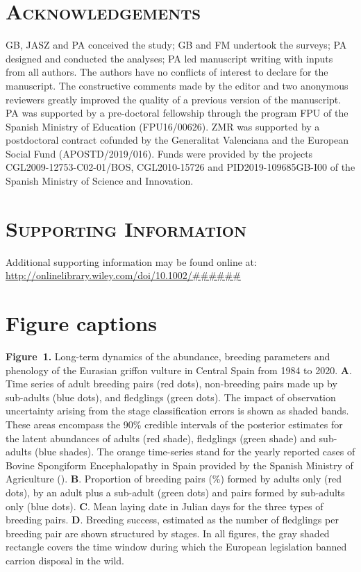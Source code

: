 \documentclass[12pt]{article}
\begin{document}
\section*{\textsc{Acknowledgements}}
GB, JASZ and PA conceived the study; GB and FM undertook the surveys; PA designed and conducted the analyses; PA led manuscript writing with inputs from all authors. The authors have no conflicts of interest to declare for the manuscript. The constructive comments made by the editor and two anonymous reviewers greatly improved the quality of a previous version of the manuscript. PA was supported by a pre-doctoral fellowship through the program FPU of the Spanish Ministry of Education (FPU16/00626). ZMR was supported by a postdoctoral contract cofunded by the Generalitat Valenciana and the European Social Fund (APOSTD/2019/016). Funds were provided by the projects CGL2009-12753-C02-01/BOS, CGL2010-15726 and PID2019-109685GB-I00 of the Spanish Ministry of Science and Innovation.

%
\printbibliography

\section*{\textsc{Supporting Information}}
Additional supporting information may be found online at:  \url{http://onlinelibrary.wiley.com/doi/10.1002/######}

\newpage

\section*{Figure captions}
\noindent \textbf{Figure~1.} Long-term dynamics of the abundance, breeding parameters and phenology of the Eurasian griffon vulture in Central Spain from 1984 to 2020. \textbf{A}. Time series of adult breeding pairs (red dots), non-breeding pairs made up by sub-adults (blue dots), and fledglings (green dots). The impact of observation uncertainty arising from the stage classification errors is shown as shaded bands. These areas encompass the 90\% credible intervals of the posterior estimates for the latent abundances of adults (red shade), fledglings (green shade) and sub-adults (blue shades). The orange time-series stand for the yearly reported cases of Bovine Spongiform Encephalopathy in Spain provided by the Spanish Ministry of Agriculture (\cite{MAPAMA2018}). \textbf{B}. Proportion of breeding pairs (\%) formed by adults only (red dots), by an adult plus a sub-adult (green dots) and pairs formed by sub-adults only (blue dots). \textbf{C}. Mean laying date in Julian days for the three types of breeding pairs. \textbf{D}. Breeding success, estimated as the number of fledglings per breeding pair are shown structured by stages. In all figures, the gray shaded rectangle covers the time window during which the European legislation banned carrion disposal in the wild.  \\
\end{document}
